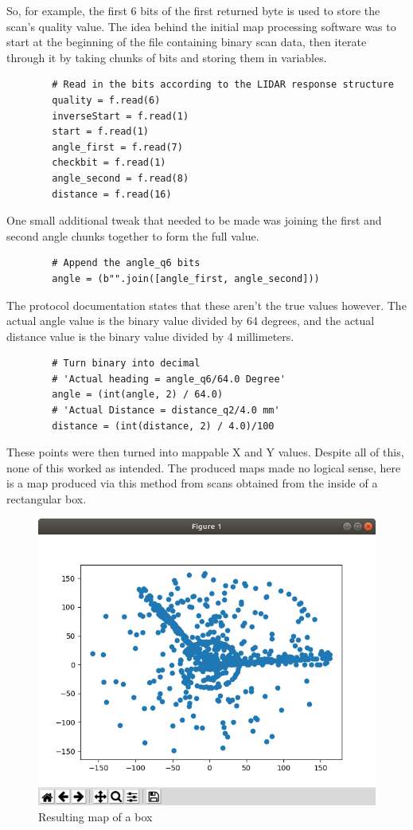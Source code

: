 		So, for example, the first 6 bits of the first returned byte is used to store the scan's quality value. The idea behind the initial map processing software was to start at the beginning of the file containing binary scan data, then iterate through it by taking chunks of bits and storing them in variables.
		
		\begin{lstlisting}
		# Read in the bits according to the LIDAR response structure
		quality = f.read(6)
		inverseStart = f.read(1)
		start = f.read(1)
		angle_first = f.read(7)
		checkbit = f.read(1)
		angle_second = f.read(8)
		distance = f.read(16)
		\end{lstlisting}
		One small additional tweak that needed to be made was joining the first and second angle chunks together to form the full value.
		
		\begin{lstlisting}
		# Append the angle_q6 bits
		angle = (b"".join([angle_first, angle_second]))
		\end{lstlisting}
		
		The protocol documentation states that these aren't the true values however. The actual angle value is the binary value divided by 64 degrees, and the actual distance value is the binary value divided by 4 millimeters.
		
		\begin{lstlisting}
		# Turn binary into decimal
		# 'Actual heading = angle_q6/64.0 Degree'
		angle = (int(angle, 2) / 64.0)
		# 'Actual Distance = distance_q2/4.0 mm'
		distance = (int(distance, 2) / 4.0)/100
		\end{lstlisting}
		These points were then turned into mappable X and Y values. Despite all of this, none of this worked as intended. The produced maps made no logical sense, here is a map produced via this method from scans obtained from the inside of a rectangular box.
		\begin{figure}[ht]
			\centering
			\includegraphics[width=.6\linewidth]{SYNTHESIS/failedmap.png}
			\caption{Resulting map of a box}
			\label{fig:failedmap}
		\end{figure}
	
